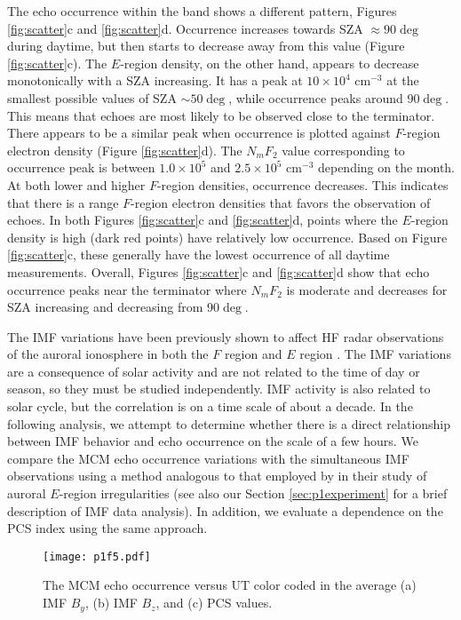 The echo occurrence within the band shows a different pattern, Figures \ref{fig:scatter}c and \ref{fig:scatter}d. Occurrence increases towards SZA \(\approx90\deg\) during daytime, but then starts to decrease away from this value (Figure \ref{fig:scatter}c). The $E$-region density, on the other hand, appears to decrease monotonically with a SZA increasing. It has a peak at \(10 \times 10^4\) cm\(^{-3}\) at the smallest possible values of SZA \(\sim50\deg\), while occurrence peaks around 90\(\deg\). This means that echoes are most likely to be observed close to the terminator. There appears to be a similar peak when occurrence is plotted against \(F\)-region electron density (Figure \ref{fig:scatter}d). The \(N_mF_2\) value corresponding to occurrence peak is between \(1.0\times 10^5\) and \(2.5\times 10^5\) cm\(^{-3}\) depending on the month.  At both lower and higher \(F\)-region densities, occurrence decreases. This indicates that there is a range \(F\)-region electron densities that favors the observation of echoes. In both Figures \ref{fig:scatter}c and \ref{fig:scatter}d, points where the \(E\)-region density is high (dark red points) have relatively low occurrence.  Based on Figure \ref{fig:scatter}c, these generally have the lowest occurrence of all daytime measurements.  Overall, Figures \ref{fig:scatter}c and \ref{fig:scatter}d show that echo occurrence peaks near the terminator where \(N_mF_2\) is moderate and decreases for SZA increasing and decreasing from 90\(\deg\).

The IMF variations have been previously shown to affect HF radar observations of the auroral ionosphere in both the \(F\) region \citep{Ballatore2001} and \(E\) region \citep{Makarevich2012}. The IMF variations are a consequence of solar activity and are not related to the time of day or season, so they must be studied independently. IMF activity is also related to solar cycle, but the correlation is on a time scale of about a decade. In the following analysis, we attempt to determine whether there is a direct relationship between IMF behavior and echo occurrence on the scale of a few hours. We compare the MCM echo occurrence variations with the simultaneous IMF observations using a method analogous to that employed by \citet{Makarevich2012} in their study of auroral \(E\)-region irregularities (see also our Section \ref{sec:p1experiment} for a brief description of IMF data analysis).  In addition, we evaluate a dependence on the PCS index using the same approach.

\begin{figure}
	\centering
	\texttt{[image: p1f5.pdf]}
	\caption[Occurrence versus UT and IMF conditions]{The MCM echo occurrence versus UT color coded in the average (a) IMF \(B_y\), (b) IMF \(B_z\), and (c) PCS values.}
	\label{fig:ut_occ}
\end{figure}

